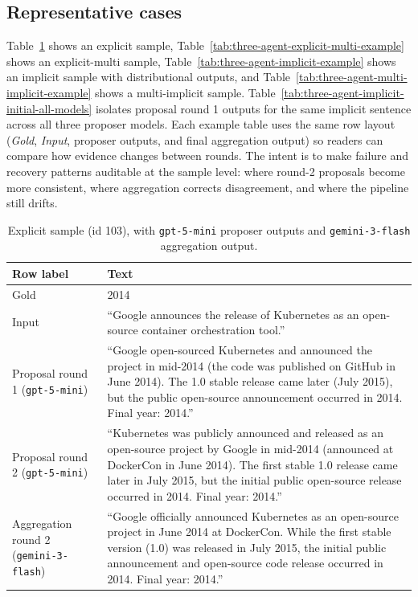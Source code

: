 \subsection*{Representative cases}
\label{sec:three-agent-examples}
Table~\ref{tab:three-agent-explicit-example} shows an explicit sample, Table~\ref{tab:three-agent-explicit-multi-example} shows an explicit-multi sample, Table~\ref{tab:three-agent-implicit-example} shows an implicit sample with distributional outputs, and Table~\ref{tab:three-agent-multi-implicit-example} shows a multi-implicit sample.
Table~\ref{tab:three-agent-implicit-initial-all-models} isolates proposal round 1 outputs for the same implicit sentence across all three proposer models.
Each example table uses the same row layout (\textit{Gold}, \textit{Input}, proposer outputs, and final aggregation output) so readers can compare how evidence changes between rounds.
The intent is to make failure and recovery patterns auditable at the sample level: where round-2 proposals become more consistent, where aggregation corrects disagreement, and where the pipeline still drifts.
\setlength{\tabcolsep}{3pt}
\renewcommand{\arraystretch}{1.10}
\begin{table}[t]
  \scriptsize
  \centering
  \caption{Explicit sample (id 103), with \texttt{gpt-5-mini} proposer outputs and \texttt{gemini-3-flash} aggregation output.}
  \label{tab:three-agent-explicit-example}
  \begin{tabular}{|p{}|p{}|}
    \hline
    Row label & Text \\
    \hline
    Gold &
    2014 \\
    \hline
    Input &
    ``Google announces the release of Kubernetes as an open-source container orchestration tool.'' \\
    \hline
    Proposal round 1 (\texttt{gpt-5-mini}) &
    ``Google open-sourced Kubernetes and announced the project in mid-2014 (the code was published on GitHub in June 2014). The 1.0 stable release came later (July 2015), but the public open-source announcement occurred in 2014. Final year: 2014.'' \\
    \hline
    Proposal round 2 (\texttt{gpt-5-mini}) &
    ``Kubernetes was publicly announced and released as an open-source project by Google in mid-2014 (announced at DockerCon in June 2014). The first stable 1.0 release came later in July 2015, but the initial public open-source release occurred in 2014. Final year: 2014.'' \\
    \hline
    Aggregation round 2 (\texttt{gemini-3-flash}) &
    ``Google officially announced Kubernetes as an open-source project in June 2014 at DockerCon. While the first stable version (1.0) was released in July 2015, the initial public announcement and open-source code release occurred in 2014. Final year: 2014.'' \\
    \hline
  \end{tabular}
\end{table}


